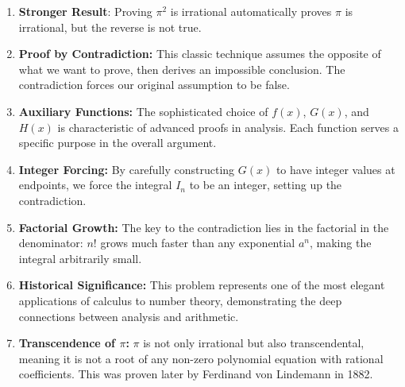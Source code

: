 \begin{takeaways}
\begin{enumerate}
    \item \textbf{Stronger Result}: Proving $\pi^2$ is irrational automatically proves $\pi$ is irrational, but the reverse is not true.
    \item \textbf{Proof by Contradiction:} This classic technique assumes the opposite of what we want to prove, then derives an impossible conclusion. The contradiction forces our original assumption to be false.
    \item \textbf{Auxiliary Functions:} The sophisticated choice of $f(x)$, $G(x)$, and $H(x)$ is characteristic of advanced proofs in analysis. Each function serves a specific purpose in the overall argument.
    \item \textbf{Integer Forcing:} By carefully constructing $G(x)$ to have integer values at endpoints, we force the integral $I_n$ to be an integer, setting up the contradiction.
    \item \textbf{Factorial Growth:} The key to the contradiction lies in the factorial in the denominator: $n!$ grows much faster than any exponential $a^n$, making the integral arbitrarily small.
    \item \textbf{Historical Significance:} This problem represents one of the most elegant applications of calculus to number theory, demonstrating the deep connections between analysis and arithmetic.
    \item \textbf{Transcendence of $\pi$:} $\pi$ is not only irrational but also transcendental, meaning it is not a root of any non-zero polynomial equation with rational coefficients. This was proven later by Ferdinand von Lindemann in 1882.
\end{enumerate}
\end{takeaways}


